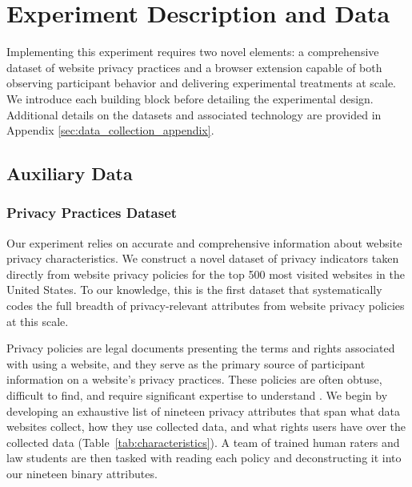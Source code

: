 \documentclass[12pt]{article}
\theoremstyle{definition}
\theoremstyle{remark}
\begin{document}
\section{Experiment Description and Data}\label{sec:experiment}

Implementing this experiment requires two novel elements: a comprehensive dataset of website privacy practices and a browser extension capable of both observing participant behavior and delivering experimental treatments at scale. We introduce each building block before detailing the experimental design. Additional details on the datasets and associated technology are provided in Appendix \ref{sec:data_collection_appendix}.

\subsection{Auxiliary Data}

\subsubsection{Privacy Practices Dataset}\label{sec:policydata}

Our experiment relies on accurate and comprehensive information about website privacy characteristics. We construct a novel dataset of privacy indicators taken directly from website privacy policies for the top 500 most visited websites in the United States. To our knowledge, this is the first dataset that systematically codes the full breadth of privacy-relevant attributes from website privacy policies at this scale.

Privacy policies are legal documents presenting the terms and rights associated with using a website, and they serve as the primary source of participant information on a website's privacy practices. These policies are often obtuse, difficult to find, and require significant expertise to understand \citep{10.1145/3573128.3604902}. We begin by developing an exhaustive list of nineteen privacy attributes that span what data websites collect, how they use collected data, and what rights users have over the collected data (Table~\ref{tab:characteristics}). A team of trained human raters and law students are then tasked with reading each policy and deconstructing it into our nineteen binary attributes.
\end{document}
